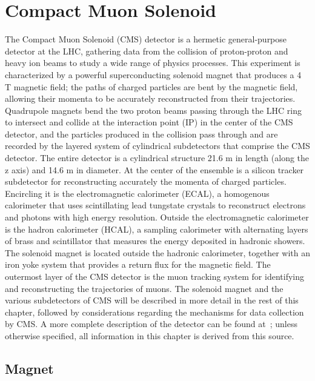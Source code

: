 \section{Compact Muon Solenoid\label{sec:cms}}

The Compact Muon Solenoid (CMS) detector is a hermetic general-purpose detector at the LHC, gathering data from the collision of proton-proton and heavy ion beams to study a wide range of physics processes. This experiment is characterized by a powerful superconducting solenoid magnet that produces a 4 T magnetic field; the paths of charged particles are bent by the magnetic field, allowing their momenta to be accurately reconstructed from their trajectories. Quadrupole magnets bend the two proton beams passing through the LHC ring to intersect and collide at the interaction point (IP) in the center of the CMS detector, and the particles produced in the collision pass through and are recorded by the layered system of cylindrical subdetectors that comprise the CMS detector. The entire detector is a cylindrical structure 21.6 m in length (along the z axis) and 14.6 m in diameter. At the center of the ensemble is a silicon tracker subdetector for reconstructing accurately the momenta of charged particles. Encircling it is the electromagnetic calorimeter (ECAL), a homogenous calorimeter that uses scintillating lead tungstate crystals to reconstruct electrons and photons with high energy resolution. Outside the electromagnetic calorimeter is the hadron calorimeter (HCAL), a sampling calorimeter with alternating layers of brass and scintillator that measures the energy deposited in hadronic showers. The solenoid magnet is located outside the hadronic calorimeter, together with an iron yoke system that provides a return flux for the magnetic field. The outermost layer of the CMS detector is the muon tracking system for identifying and reconstructing the trajectories of muons. The solenoid magnet and the various subdetectors of CMS will be described in more detail in the rest of this chapter, followed by considerations regarding the mechanisms for data collection by CMS. A more complete description of the detector can be found at~\cite{1748-0221-3-08-S08004}; unless otherwise specified, all information in this chapter is derived from this source.

\subsection{Magnet\label{sec:cms-magnet}}

